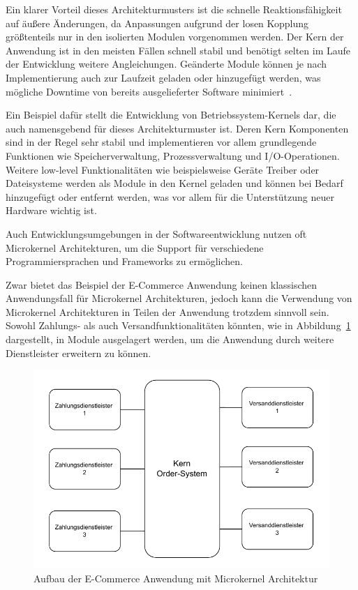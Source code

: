 \documentclass[acmtog]{acmart}
\begin{document}
Ein klarer Vorteil dieses Architekturmusters ist die schnelle Reaktionsfähigkeit auf äußere Änderungen, da Anpassungen aufgrund der losen Kopplung größtenteils nur in den isolierten Modulen vorgenommen werden.
Der Kern der Anwendung ist in den meisten Fällen schnell stabil und benötigt selten im Laufe der Entwicklung weitere Angleichungen.
Geänderte Module können je nach Implementierung auch zur Laufzeit geladen oder hinzugefügt werden, was mögliche Downtime von bereits ausgelieferter Software minimiert~\cite[25]{architecturePatterns}.

Ein Beispiel dafür stellt die Entwicklung von Betriebssystem-Kernels dar, die auch namensgebend für dieses Architekturmuster ist.
Deren Kern Komponenten sind in der Regel sehr stabil und implementieren vor allem grundlegende Funktionen wie Speicherverwaltung, Prozessverwaltung und I/O-Operationen.
Weitere low-level Funktionalitäten wie beispielsweise Geräte Treiber oder Dateisysteme werden als Module in den Kernel geladen und können bei Bedarf hinzugefügt oder entfernt werden, was vor allem für die Unterstützung neuer Hardware wichtig ist.

Auch Entwicklungsumgebungen in der Softwareentwicklung nutzen oft Microkernel Architekturen, um die Support für verschiedene Programmiersprachen und Frameworks zu ermöglichen.

Zwar bietet das Beispiel der E-Commerce Anwendung keinen klassischen Anwendungsfall für Microkernel Architekturen, jedoch kann die Verwendung von Microkernel Architekturen in Teilen der Anwendung trotzdem sinnvoll sein.
Sowohl Zahlungs- als auch Versandfunktionalitäten könnten, wie in Abbildung~\ref{fig:ecommerce-microkernel} dargestellt, in Module ausgelagert werden, um die Anwendung durch weitere Dienstleister erweitern zu können.

\begin{figure}[!h]
  \centering
  \includegraphics[width=\linewidth]{images/microkernel/ecommerce-microkernel}
  \caption{Aufbau der E-Commerce Anwendung mit Microkernel Architektur}
  \label{fig:ecommerce-microkernel}
\end{figure}
\end{document}
